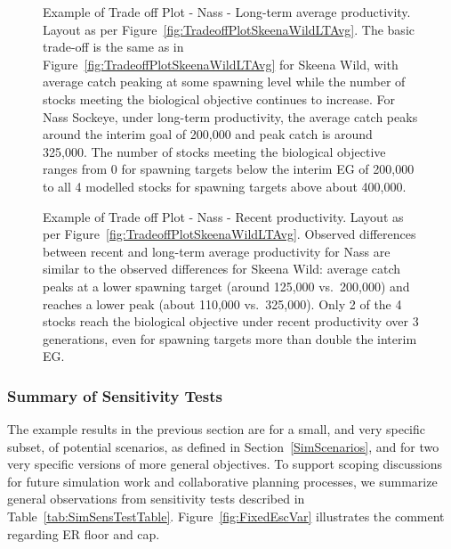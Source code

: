 \documentclass[french,11pt]{book}
\begin{document}
\begin{figure}[htb]

{\centering {} 

}

\caption{Example of Trade off Plot - Nass - Long-term average productivity. Layout as per Figure~\ref{fig:TradeoffPlotSkeenaWildLTAvg}. The basic trade-off is the same as in Figure~\ref{fig:TradeoffPlotSkeenaWildLTAvg} for Skeena Wild, with average catch peaking at some spawning level while the number of stocks meeting the biological objective continues to increase. For Nass Sockeye, under long-term productivity, the average catch peaks around the interim goal of 200,000 and peak catch is around 325,000. The number of stocks meeting the biological objective ranges from 0 for spawning targets below the interim EG of 200,000 to all 4 modelled stocks for spawning targets above about 400,000.}\label{fig:TradeoffPlotNassLTAvg}
\end{figure}
\clearpage


\begin{figure}[htb]

{\centering {} 

}

\caption{Example of Trade off Plot - Nass - Recent productivity. Layout as per Figure~\ref{fig:TradeoffPlotSkeenaWildLTAvg}. Observed differences between recent and long-term average productivity for Nass are similar to the observed differences for Skeena Wild: average catch peaks at a lower spawning target (around 125,000 vs.~200,000) and reaches a lower peak (about 110,000 vs.~325,000). Only 2 of the 4 stocks reach the biological objective under recent productivity over 3 generations, even for spawning targets more than double the interim EG.}\label{fig:TradeoffPlotNassRecent}
\end{figure}
\clearpage

\subsubsection{Summary of Sensitivity Tests}\label{summary-of-sensitivity-tests}

The example results in the previous section are for a small, and very specific subset, of potential scenarios, as defined in Section~\ref{SimScenarios}, and for two very specific versions of more general objectives. To support scoping discussions for future simulation work and collaborative planning processes, we summarize general observations from sensitivity tests described in Table~\ref{tab:SimSensTestTable}. Figure~\ref{fig:FixedEscVar} illustrates the comment regarding ER floor and cap.
\end{document}
